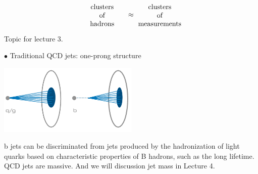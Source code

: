 \documentclass[9pt,a4paper,unknownkeysallowed,xcolor=dvipsnames,aspectratio=43]{beamer}
\begin{document}
\begin{frame}{\bf\huge {}}
\begin{align}
\begin{minipage}[c]{0.2\textwidth}
    \begin{center}
  clusters\\
  of\\
  hadrons
    \end{center}
\end{minipage}
\approx
\begin{minipage}[c]{0.2\textwidth}
    \begin{center}
  clusters\\
  of\\
  measurements
    \end{center}
\end{minipage}\notag
\end{align}
\begin{center}
    {\color{darkred} Topic for lecture 3.}
\end{center}
\end{frame}
%
%
\begin{frame}{\bf\huge {}}
\vspace{2mm}
{\color{darkred}\Large$\bullet$} Traditional {\color{red}QCD jets}: one-prong structure\\
\vspace{1mm}
\begin{center}
\includegraphics[width=0.5\textwidth]{01/qcdjets.png}
\end{center}
b jets can be discriminated from jets produced by the hadronization of light quarks based on characteristic properties of B hadrons, such as the long lifetime.\\
\vspace{2mm}
QCD jets are massive. And we will discussion {\color{darkred}jet mass in Lecture 4}.
\end{frame}
%
%
\end{document}
